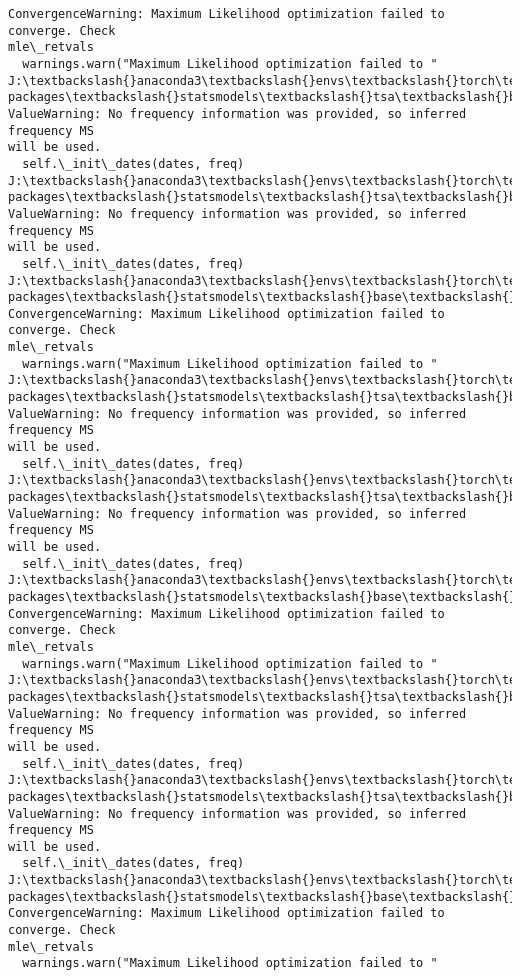 \documentclass[11pt]{article}
\begin{document}
\begin{Verbatim}[commandchars=\\\{\}]
ConvergenceWarning: Maximum Likelihood optimization failed to converge. Check
mle\_retvals
  warnings.warn("Maximum Likelihood optimization failed to "
J:\textbackslash{}anaconda3\textbackslash{}envs\textbackslash{}torch\textbackslash{}Lib\textbackslash{}site-packages\textbackslash{}statsmodels\textbackslash{}tsa\textbackslash{}base\textbackslash{}tsa\_model.py:473:
ValueWarning: No frequency information was provided, so inferred frequency MS
will be used.
  self.\_init\_dates(dates, freq)
J:\textbackslash{}anaconda3\textbackslash{}envs\textbackslash{}torch\textbackslash{}Lib\textbackslash{}site-packages\textbackslash{}statsmodels\textbackslash{}tsa\textbackslash{}base\textbackslash{}tsa\_model.py:473:
ValueWarning: No frequency information was provided, so inferred frequency MS
will be used.
  self.\_init\_dates(dates, freq)
J:\textbackslash{}anaconda3\textbackslash{}envs\textbackslash{}torch\textbackslash{}Lib\textbackslash{}site-packages\textbackslash{}statsmodels\textbackslash{}base\textbackslash{}model.py:607:
ConvergenceWarning: Maximum Likelihood optimization failed to converge. Check
mle\_retvals
  warnings.warn("Maximum Likelihood optimization failed to "
J:\textbackslash{}anaconda3\textbackslash{}envs\textbackslash{}torch\textbackslash{}Lib\textbackslash{}site-packages\textbackslash{}statsmodels\textbackslash{}tsa\textbackslash{}base\textbackslash{}tsa\_model.py:473:
ValueWarning: No frequency information was provided, so inferred frequency MS
will be used.
  self.\_init\_dates(dates, freq)
J:\textbackslash{}anaconda3\textbackslash{}envs\textbackslash{}torch\textbackslash{}Lib\textbackslash{}site-packages\textbackslash{}statsmodels\textbackslash{}tsa\textbackslash{}base\textbackslash{}tsa\_model.py:473:
ValueWarning: No frequency information was provided, so inferred frequency MS
will be used.
  self.\_init\_dates(dates, freq)
J:\textbackslash{}anaconda3\textbackslash{}envs\textbackslash{}torch\textbackslash{}Lib\textbackslash{}site-packages\textbackslash{}statsmodels\textbackslash{}base\textbackslash{}model.py:607:
ConvergenceWarning: Maximum Likelihood optimization failed to converge. Check
mle\_retvals
  warnings.warn("Maximum Likelihood optimization failed to "
J:\textbackslash{}anaconda3\textbackslash{}envs\textbackslash{}torch\textbackslash{}Lib\textbackslash{}site-packages\textbackslash{}statsmodels\textbackslash{}tsa\textbackslash{}base\textbackslash{}tsa\_model.py:473:
ValueWarning: No frequency information was provided, so inferred frequency MS
will be used.
  self.\_init\_dates(dates, freq)
J:\textbackslash{}anaconda3\textbackslash{}envs\textbackslash{}torch\textbackslash{}Lib\textbackslash{}site-packages\textbackslash{}statsmodels\textbackslash{}tsa\textbackslash{}base\textbackslash{}tsa\_model.py:473:
ValueWarning: No frequency information was provided, so inferred frequency MS
will be used.
  self.\_init\_dates(dates, freq)
J:\textbackslash{}anaconda3\textbackslash{}envs\textbackslash{}torch\textbackslash{}Lib\textbackslash{}site-packages\textbackslash{}statsmodels\textbackslash{}base\textbackslash{}model.py:607:
ConvergenceWarning: Maximum Likelihood optimization failed to converge. Check
mle\_retvals
  warnings.warn("Maximum Likelihood optimization failed to "
    \end{Verbatim}
\end{document}

